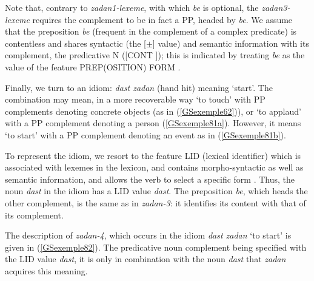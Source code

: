 \documentclass[output=paper
                ,modfonts
                ,nonflat
	        ,collection
	        ,collectionchapter
	        ,collectiontoclongg
 	        ,biblatex
                ,babelshorthands
                ,newtxmath
                ,draftmode
                ,colorlinks, citecolor=brown
]{./langsci/langscibook}
\begin{document}
{Note that, contrary to \emph{zadan1-lexeme}, with which \emph{be} is optional, the \emph{zadan3-lexeme} requires the complement to be in fact a PP, headed by \emph{be}. We assume that the preposition \emph{be} (frequent in the complement of a complex predicate) is contentless and shares syntactic (the [\prd $\pm$] value) and semantic information with its complement, the predicative N ([CONT ]); this is indicated by treating \emph{be} as the value of the feature PREP(OSITION) FORM \citep[Chapter~3]{ps}.  

Finally, we turn to an idiom: \emph{dast zadan} (hand hit) meaning `start'. The combination may mean, in a more recoverable way `to touch' with PP complements denoting concrete objects (as in (\ref{GSexemple62})), or `to applaud' with a PP complement denoting a person (\ref{GSexemple81a}). However, it means `to start' with a PP complement denoting an event as in (\ref{GSexemple81b}).

\eal
	\label{GSexemple81} 
	\label{GSexemple81a}
		
    \label{GSexemple81b}
\zl

To represent the idiom, we resort to the feature LID (lexical identifier) which is associated with lexemes in the lexicon, and contains morpho-syntactic as well as semantic information, and allows the verb to select a specific form \citep{Sag2007a, Sag2012a}. Thus, the noun \emph{dast} in the idiom has a LID value \emph{dast}. The preposition \emph{be}, which heads the other complement, is the same as in \emph{zadan-3}: it identifies its content with that of its complement.

The description of \emph{zadan-4}, which occurs in the idiom \emph{dast zadan} `to start' is given in (\ref{GSexemple82}). The predicative noun complement being specified with the LID value \emph{dast}, it is only in combination with the noun \emph{dast} that \emph{zadan} acquires this meaning.


}
\end{document}
